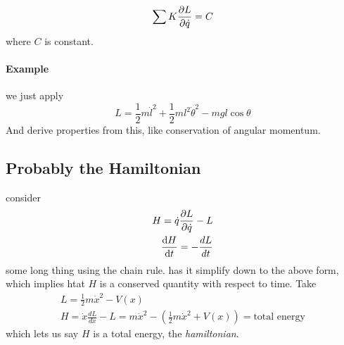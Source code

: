 \documentclass{article} \usepackage{amsmath} \usepackage{amssymb} \usepackage{amsthm} \usepackage[margin=0.2in]{geometry} \usepackage{hyperref} \usepackage{physics} \usepackage{tikz} \usepackage{mathtools} \mathtoolsset{showonlyrefs} \theoremstyle{definition} \newtheorem{theorem}{Theorem}[section] \newtheorem{corollary}{Corollary}[theorem] \newtheorem{lemma}[theorem]{Lemma} \newtheorem{definition}{Definition}[section] \author{Connor Duncan} \date{\today}
\begin{document}
\begin{equation} \sum K\pdv{L}{\dot q}=C \end{equation} where $C$ is constant. \paragraph{Example} \begin{center}  \end{center} we just apply \begin{equation} L=\frac{1}{2}m\dot l^2+\frac{1}{2}ml^2\dot\theta^2-mgl\cos\theta \end{equation} And derive properties from this, like conservation of angular momentum. \subsection{Probably the Hamiltonian} consider \begin{align} H=\dot q\pdv{L}{\dot q}-L\\ \dv{H}{t}=-\frac{dL}{dt} \end{align} some long thing using the chain rule. has it simplify down to the above form, which implies htat $H$ is a conserved quantity with respect to time. Take \begin{align} L=\frac{1}{2}m\dot x^2-V(x)\\ H=\dot x\frac{dL}{d\dot x}-L=m\dot x^2-(\frac{1}{2}m\dot x^2+V(x))=\text{total energy} \end{align} which lets us say $H$ is a total energy, the \emph{hamiltonian}.
\end{document}
